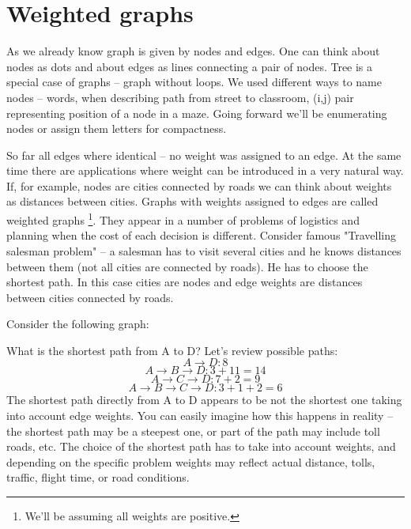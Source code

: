 \section{Weighted graphs}

As we already know graph is given by nodes and edges. One can think
about nodes as dots and about edges as lines connecting
a pair of nodes. Tree is a special case of graphs -- graph without loops.
We used different ways to name nodes -- words, when describing
path from street to classroom, (i,j) pair representing
position of a node in a maze. Going forward we'll be
enumerating nodes or assign them letters for compactness.

So far all edges where identical -- no weight was assigned
to an edge. At the same time there are applications where
weight can be introduced in a very natural way. If, for example,
nodes are cities connected by roads we can think about weights
as distances between cities. Graphs with weights assigned to
edges are called weighted graphs \footnote{We'll be assuming
all weights are positive.}. They appear in a number of
problems of logistics and planning when the cost of
each decision is different. Consider famous
"Travelling salesman problem" -- a salesman has to visit
several cities and he knows distances between them (not all
cities are connected by roads). He has to choose the shortest path.
In this case cities are nodes and edge weights are distances
between cities connected by roads.

Consider the following graph:

\begin {center}
\end{center}


What is the shortest path from A to D? Let's review possible paths:
$$
A \rightarrow D: 8
$$
$$
A \rightarrow B \rightarrow D: 3 + 11 = 14
$$
$$
A \rightarrow C \rightarrow D: 7 + 2 = 9
$$
$$
A \rightarrow B \rightarrow C \rightarrow D: 3 + 1 + 2 = 6
$$
The shortest path directly from A to D appears to be not the
shortest one taking into account edge weights. You can easily 
imagine how this happens in reality -- 
the shortest path may be a steepest one,
or part of the path may include toll roads, etc. 
The choice of the shortest
path has to take into account weights, and depending on the specific problem
weights may reflect actual distance, tolls, traffic,
flight time, or road conditions.

